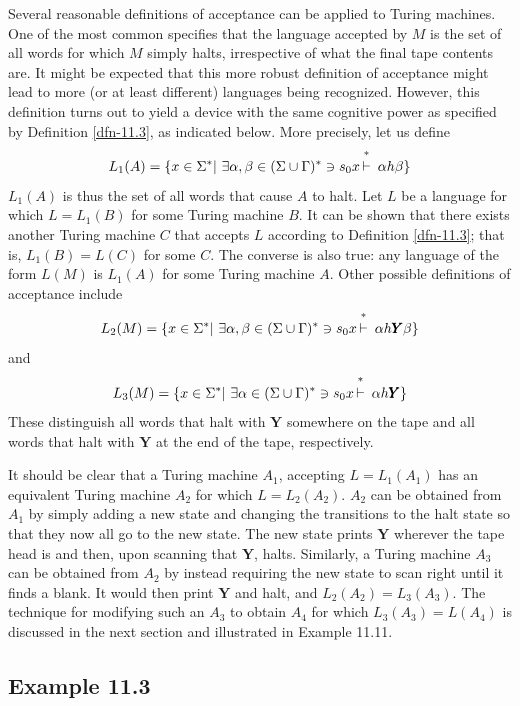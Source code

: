 Several reasonable definitions of acceptance can be applied to Turing machines.
One of the most common specifies that the language accepted by $M$ is the set
of all words for which $M$ simply halts, irrespective of what the final tape
contents are. It might be expected that this more robust definition of
acceptance might lead to more (or at least different) languages being recognized.
However, this definition turns out to yield a device with the same cognitive
power as specified by Definition \ref{dfn-11.3}, as indicated below. More precisely, let
us define
\[ L_1(A) = \{x\in\Sigma^*|\ \exists\alpha,\beta\in(\Sigma\cup\Gamma)^*\ni s_0 x
	\Dvdash \alpha h\beta\} \]
$L_1(A)$ is thus the set of all words that cause $A$ to halt. Let $L$ be a
language for which $L=L_1(B)$ for some Turing machine $B$. It can be shown that
there exists another Turing machine $C$ that accepts $L$ according to Definition
\ref{dfn-11.3}; that is, $L_1(B)=L(C)$ for some $C$. The converse is also true: any
language of the form $L(M)$ is $L_1(A)$ for some Turing machine $A$. Other
possible definitions of acceptance include
\[ L_2(M) = \{x\in\Sigma^*|\ \exists\alpha,\beta\in(\Sigma\cup\Gamma)^*\ni s_0 x
	\Dvdash \alpha h\pmb{Y}\beta\} \]
and
\[ L_3(M) = \{x\in\Sigma^*|\ \exists\alpha\in(\Sigma\cup\Gamma)^*\ni s_0 x\Dvdash
	\alpha h\pmb{Y}\} \]
These distinguish all words that halt with $\pmb{Y}$ somewhere on the tape and
all words that halt with $\pmb{Y}$ at the end of the tape, respectively.

It should be clear that a Turing machine $A_1$, accepting $L=L_1(A_1)$ has an
equivalent Turing machine $A_2$ for which $L=L_2(A_2)$. $A_2$ can be obtained
from $A_1$ by simply adding a new state and changing the transitions to the halt
state so that they now all go to the new state. The new state prints $\pmb{Y}$
wherever the tape head is and then, upon scanning that $\pmb{Y}$, halts.
Similarly, a Turing machine $A_3$ can be obtained from $A_2$ by instead
requiring the new state to scan right until it finds a blank. It would then
print $\pmb{Y}$ and halt, and $L_2(A_2)=L_3(A_3)$. The technique for modifying
such an $A_3$ to obtain $A_4$ for which $L_3(A_3)=L(A_4)$ is discussed in the
next section and illustrated in Example 11.11.

\subsection*{Example 11.3}

